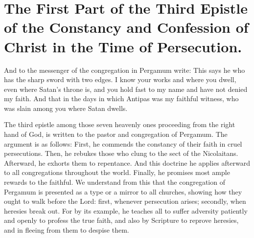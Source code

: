 \chapter[Sermon 10. The First Part of the Third Epistle of the Constancy and Confession of Christ in the Time of Persecution.]{The First Part of the Third Epistle of the Constancy and Confession of Christ in the Time of Persecution.}
\label{sermon:010}

And to the messenger of the congregation in Pergamum write: This says he who has the sharp sword with two edges. I know your works and where you dwell, even where Satan’s throne is, and you hold fast to my name and have not denied my faith. And that in the days in which Antipas was my faithful witness, who was slain among you where Satan dwells.

The third epistle among those seven heavenly ones proceeding from the right hand of God, is written to the pastor and congregation of Pergamum. The argument is as follows: First, he commends the constancy of their faith in cruel persecutions. Then, he rebukes those who clung to the sect of the Nicolaitans. Afterward, he exhorts them to repentance. And this doctrine he applies afterward to all congregations throughout the world. Finally, he promises most ample rewards to the faithful. We understand from this that the congregation of Pergamum is presented as a type or a mirror to all churches, showing how they ought to walk before the Lord: first, whenever persecution arises; secondly, when heresies break out. For by its example, he teaches all to suffer adversity patiently and openly to profess the true faith, and also by Scripture to reprove heresies, and in fleeing from them to despise them.


